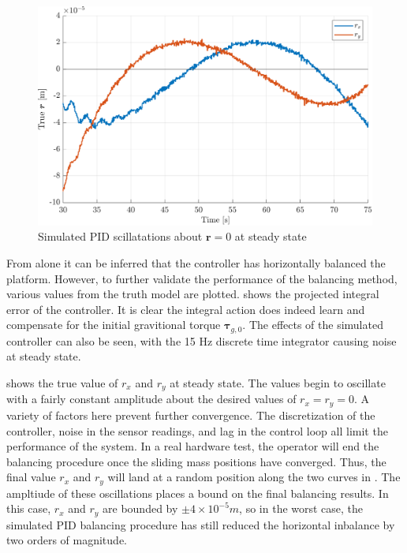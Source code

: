 \begin{figure}[h]
    \centering
    \includegraphics[width=0.9\linewidth]{plots/PID_sim_oscillations.pdf}
    \caption{Simulated PID scillatations about $\bm{r}=0$ at steady state}
    \label{fig:PID_sim_oscillations}
\end{figure}


From  alone it can be inferred that the controller has horizontally balanced the platform. However, to further validate the performance of the balancing method, various values from the truth model are plotted.  shows the projected integral error of the controller. It is clear the integral action does indeed learn and compensate for the initial gravitional torque $\bm{\tau}_{g,0}$. The effects of the simulated controller can also be seen, with the 15 Hz discrete time integrator causing noise at steady state.


 shows the true value of $r_x$ and $r_y$ at steady state. The values begin to oscillate with a fairly constant amplitude about the desired values of $r_x = r_y = 0$. A variety of factors here prevent further convergence. The discretization of the controller, noise in the sensor readings, and lag in the control loop all limit the performance of the system. In a real hardware test, the operator will end the balancing procedure once the sliding mass positions have converged. Thus, the final value $r_x$ and $r_y$ will land at a random position along the two curves in . The ampltiude of these oscillations places a bound on the final balancing results. In this case, $r_x$ and $r_y$ are bounded by $\pm4\times10^{-5}m$, so in the worst case, the simulated PID balancing procedure has still reduced the horizontal inbalance by two orders of magnitude.

